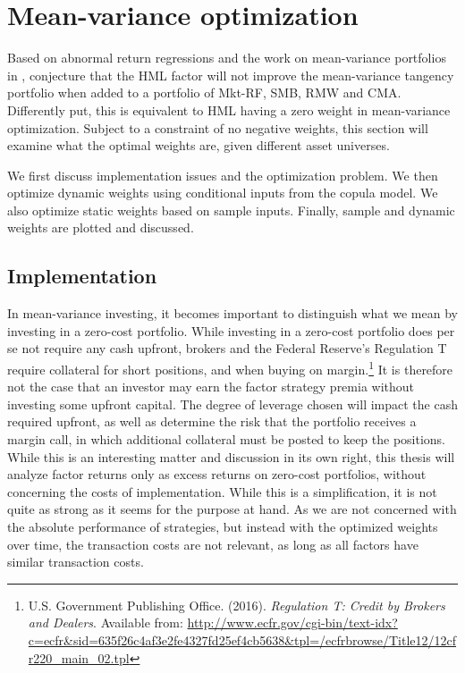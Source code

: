 
\section{Mean-variance optimization}
\label{sec:mean_variance}

Based on abnormal return regressions and the work on mean-variance portfolios in \textcite{HubermanKandel1987}, \textcite{FF2015} conjecture that the HML factor will not improve the mean-variance tangency portfolio when added to a portfolio of Mkt-RF, SMB, RMW and CMA. Differently put, this is equivalent to HML having a zero weight in mean-variance optimization. Subject to a constraint of no negative weights, this section will examine what the optimal weights are, given different asset universes.

We first discuss implementation issues and the optimization problem. We then optimize dynamic weights using conditional inputs from the copula model. We also optimize static weights based on sample inputs. Finally, sample and dynamic weights are plotted and discussed.

\subsection{Implementation}

In mean-variance investing, it becomes important to distinguish what we mean by investing in a zero-cost portfolio. While investing in a zero-cost portfolio does per se not require any cash upfront, brokers and the Federal Reserve's Regulation T require collateral for short positions, and when buying on margin.\footnote{U.S. Government Publishing Office. (2016). \textit{Regulation T: Credit by Brokers and Dealers}. Available from: \url{http://www.ecfr.gov/cgi-bin/text-idx?c=ecfr&sid=635f26c4af3e2fe4327fd25ef4cb5638&tpl=/ecfrbrowse/Title12/12cfr220_main_02.tpl}} It is therefore not the case that an investor may earn the factor strategy premia without investing some upfront capital. The degree of leverage chosen will impact the cash required upfront, as well as determine the risk that the portfolio receives a margin call, in which additional collateral must be posted to keep the positions. While this is an interesting matter and discussion in its own right, this thesis will analyze factor returns only as excess returns on zero-cost portfolios, without concerning the costs of implementation. While this is a simplification, it is not quite as strong as it seems for the purpose at hand. As we are not concerned with the absolute performance of strategies, but instead with the optimized weights over time, the transaction costs are not relevant, as long as all factors have similar transaction costs.

